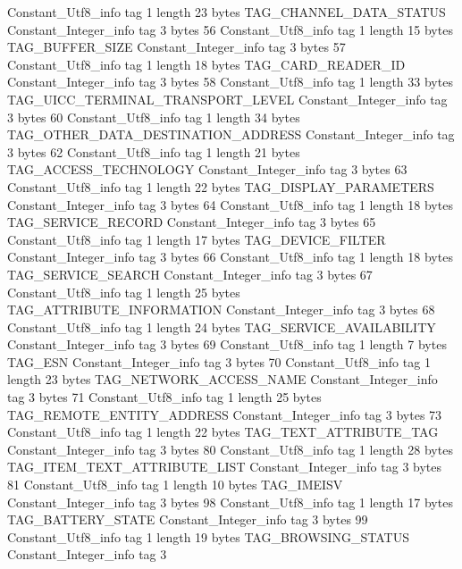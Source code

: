 {{		Constant_Utf8_info {
			tag	1
			length	23
			bytes	TAG_CHANNEL_DATA_STATUS
		}
		Constant_Integer_info {
			tag	3
			bytes	56
		}
		Constant_Utf8_info {
			tag	1
			length	15
			bytes	TAG_BUFFER_SIZE
		}
		Constant_Integer_info {
			tag	3
			bytes	57
		}
		Constant_Utf8_info {
			tag	1
			length	18
			bytes	TAG_CARD_READER_ID
		}
		Constant_Integer_info {
			tag	3
			bytes	58
		}
		Constant_Utf8_info {
			tag	1
			length	33
			bytes	TAG_UICC_TERMINAL_TRANSPORT_LEVEL
		}
		Constant_Integer_info {
			tag	3
			bytes	60
		}
		Constant_Utf8_info {
			tag	1
			length	34
			bytes	TAG_OTHER_DATA_DESTINATION_ADDRESS
		}
		Constant_Integer_info {
			tag	3
			bytes	62
		}
		Constant_Utf8_info {
			tag	1
			length	21
			bytes	TAG_ACCESS_TECHNOLOGY
		}
		Constant_Integer_info {
			tag	3
			bytes	63
		}
		Constant_Utf8_info {
			tag	1
			length	22
			bytes	TAG_DISPLAY_PARAMETERS
		}
		Constant_Integer_info {
			tag	3
			bytes	64
		}
		Constant_Utf8_info {
			tag	1
			length	18
			bytes	TAG_SERVICE_RECORD
		}
		Constant_Integer_info {
			tag	3
			bytes	65
		}
		Constant_Utf8_info {
			tag	1
			length	17
			bytes	TAG_DEVICE_FILTER
		}
		Constant_Integer_info {
			tag	3
			bytes	66
		}
		Constant_Utf8_info {
			tag	1
			length	18
			bytes	TAG_SERVICE_SEARCH
		}
		Constant_Integer_info {
			tag	3
			bytes	67
		}
		Constant_Utf8_info {
			tag	1
			length	25
			bytes	TAG_ATTRIBUTE_INFORMATION
		}
		Constant_Integer_info {
			tag	3
			bytes	68
		}
		Constant_Utf8_info {
			tag	1
			length	24
			bytes	TAG_SERVICE_AVAILABILITY
		}
		Constant_Integer_info {
			tag	3
			bytes	69
		}
		Constant_Utf8_info {
			tag	1
			length	7
			bytes	TAG_ESN
		}
		Constant_Integer_info {
			tag	3
			bytes	70
		}
		Constant_Utf8_info {
			tag	1
			length	23
			bytes	TAG_NETWORK_ACCESS_NAME
		}
		Constant_Integer_info {
			tag	3
			bytes	71
		}
		Constant_Utf8_info {
			tag	1
			length	25
			bytes	TAG_REMOTE_ENTITY_ADDRESS
		}
		Constant_Integer_info {
			tag	3
			bytes	73
		}
		Constant_Utf8_info {
			tag	1
			length	22
			bytes	TAG_TEXT_ATTRIBUTE_TAG
		}
		Constant_Integer_info {
			tag	3
			bytes	80
		}
		Constant_Utf8_info {
			tag	1
			length	28
			bytes	TAG_ITEM_TEXT_ATTRIBUTE_LIST
		}
		Constant_Integer_info {
			tag	3
			bytes	81
		}
		Constant_Utf8_info {
			tag	1
			length	10
			bytes	TAG_IMEISV
		}
		Constant_Integer_info {
			tag	3
			bytes	98
		}
		Constant_Utf8_info {
			tag	1
			length	17
			bytes	TAG_BATTERY_STATE
		}
		Constant_Integer_info {
			tag	3
			bytes	99
		}
		Constant_Utf8_info {
			tag	1
			length	19
			bytes	TAG_BROWSING_STATUS
		}
		Constant_Integer_info {
			tag	3
}}}
